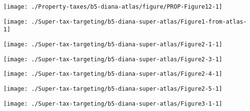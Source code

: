 \documentclass[tikz]{standalone}\usepackage[]{graphicx}\usepackage[]{color}
\newenvironment{knitrout}{}{} %
\begin{document}
\begin{knitrout}
\color{fgcolor}
\texttt{[image: ./Property-taxes/b5-diana-atlas/figure/PROP-Figure12-1]} 

\end{knitrout}



\newpage
\begin{knitrout}
\color{fgcolor}
\texttt{[image: ./Super-tax-targeting/b5-diana-super-atlas/Figure1-from-atlas-1]} 

\end{knitrout}

\begin{knitrout}
\color{fgcolor}
\texttt{[image: ./Super-tax-targeting/b5-diana-super-atlas/Figure2-1-1]} 

\end{knitrout}

\begin{knitrout}
\color{fgcolor}
\texttt{[image: ./Super-tax-targeting/b5-diana-super-atlas/Figure2-3-1]} 

\end{knitrout}

\begin{knitrout}
\color{fgcolor}
\texttt{[image: ./Super-tax-targeting/b5-diana-super-atlas/Figure2-4-1]} 

\end{knitrout}

\begin{knitrout}
\color{fgcolor}
\texttt{[image: ./Super-tax-targeting/b5-diana-super-atlas/Figure2-5-1]} 

\end{knitrout}

\begin{knitrout}
\color{fgcolor}
\texttt{[image: ./Super-tax-targeting/b5-diana-super-atlas/Figure3-1-1]} 

\end{knitrout}
\end{document}
